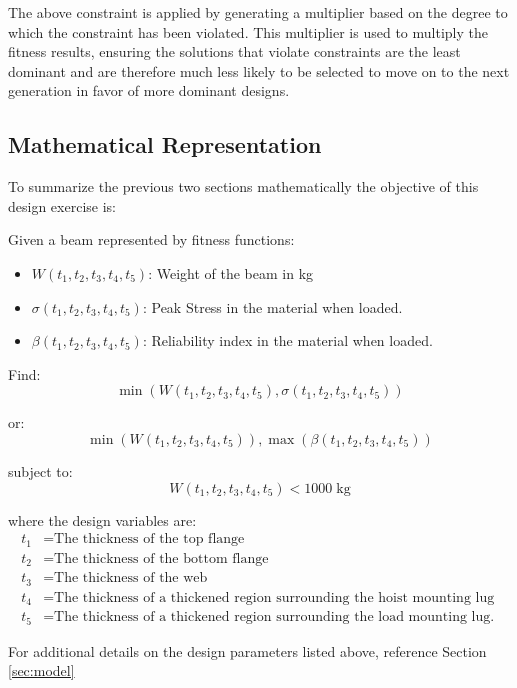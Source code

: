 The above constraint is applied by generating a multiplier based on the degree to which the constraint has been violated. This multiplier is used to multiply the fitness results, ensuring the solutions that violate constraints are the least dominant and are therefore much less likely to be selected to move on to the next generation in favor of more dominant designs.

\subsection{Mathematical Representation}
To summarize the previous two sections mathematically the objective of this design exercise is: 

Given a beam represented by fitness functions: 

\begin{itemize}
  \item $W(t_1, t_2, t_3, t_4, t_5)$: Weight of the beam in kg
  \item $\sigma(t_1, t_2, t_3, t_4, t_5)$: Peak Stress in the material when loaded. 
  \item $\beta(t_1, t_2, t_3, t_4, t_5)$: Reliability index in the material when loaded. 
\end{itemize}

Find: 
	$$\min\left(W(t_1, t_2, t_3, t_4, t_5), \sigma(t_1, t_2, t_3, t_4, t_5)\right)$$

or: 
	$$\min\left(W(t_1, t_2, t_3, t_4, t_5)\right), \max\left(\beta(t_1, t_2, t_3, t_4, t_5)\right)$$

subject to:
	$$W(t_1, t_2, t_3, t_4, t_5) < 1000 \; \text{kg}$$

where the design variables are:
\begin{align*}
   t_1 &= \text{The thickness of the top flange}\\
   t_2 &= \text{The thickness of the bottom flange}\\
   t_3 &= \text{The thickness of the web}\\
   t_4 &= \text{The thickness of a thickened region surrounding the hoist mounting lug}\\
   t_5 &= \text{The thickness of a thickened region surrounding the load mounting lug. }
\end{align*}

For additional details on the design parameters listed above, reference Section \ref{sec:model}

